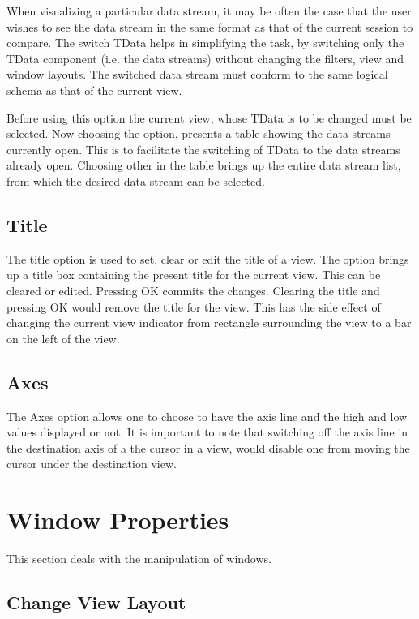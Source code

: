 When visualizing a particular data stream, it may be often the case that the user wishes to see the data stream in the same format as that of the current session to compare. The switch TData helps in simplifying the task, by switching only the TData component (i.e. the data streams) without changing the filters, view and window layouts. The switched data stream must conform to the same logical schema as that of the current  view.

Before using this option the current view, whose TData is to be changed must be selected.  Now choosing the option, presents a table showing the data streams currently open. This is to facilitate the switching of TData to the data streams already open. Choosing other in the table brings up the entire data stream list, from which the desired data stream can be selected.


\subsection{Title}

The title option is used to set, clear or edit the title of a view. The option brings up a title box containing the present title for the current view. This can be cleared or edited. Pressing OK commits the changes. Clearing the title and pressing OK would remove the title for the view. This has the side effect of changing the current view indicator from  rectangle surrounding the view to a bar on the left of the view.

\subsection{Axes}

The Axes option allows one to choose to have the axis line and the high and low values displayed or not. It is important to note that switching off the axis line in the destination axis of a the cursor in a view, would disable one from moving the cursor under the  destination view.

\section{Window Properties}

This section deals with the manipulation of windows.

\subsection{Change View Layout}

